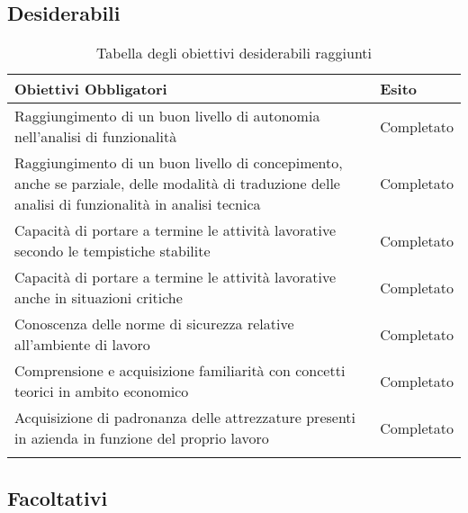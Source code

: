 \subsection{Desiderabili}

	\begin{center}
		  \bgroup
		  \def\arraystretch{1.4}
		   \begin{longtable}{ | p{9cm} | p{2cm} | }  \hline
			 
			 \cellcolor[gray]{0.9} \textbf{Obiettivi Obbligatori} & \cellcolor[gray]{0.9} \textbf{Esito} \\ \hline
						 
			Raggiungimento di un buon livello di autonomia nell'analisi di funzionalità & Completato  \\ \hline
			Raggiungimento di un buon livello di concepimento, anche se parziale, delle modalità di traduzione delle analisi di funzionalità in analisi tecnica & Completato \\ \hline
			Capacità di portare a termine le attività lavorative secondo le tempistiche stabilite & Completato \\ \hline
			Capacità di portare a termine le attività lavorative anche in situazioni critiche & Completato \\ \hline
			Conoscenza delle norme di sicurezza relative all'ambiente di lavoro & Completato \\ \hline
			Comprensione e acquisizione familiarità con concetti teorici in ambito economico & Completato  \\ \hline
			Acquisizione di padronanza delle attrezzature presenti in azienda in funzione del proprio lavoro & Completato \\ \hline
			
			\caption{Tabella degli obiettivi desiderabili raggiunti}
			
		    \end{longtable}
		  \egroup
		\end{center}

\subsection{Facoltativi}

